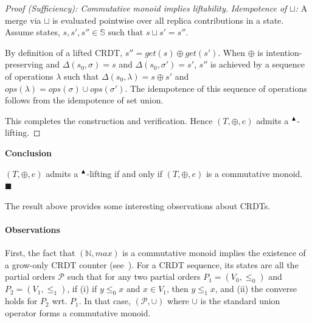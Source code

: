 \begin{proof}[Proof (Sufficiency): Commutative monoid implies liftability]


\noindent\textit{Idempotence of $\sqcup$:} A merge via $\sqcup$ is evaluated pointwise over all replica contributions in a state. Assume states, $s, s', s'' \in \mathbb{S}\text{ such that } s\sqcup s' = s''$. 

By definition of a lifted CRDT, $s'' = get(s) \oplus get (s')$. 
When $\oplus$ is intention-preserving and $\Delta(s_0,\sigma)=s$ and $\Delta(s_0,\sigma')=s'$, $s''$ is achieved by a sequence of operations $\lambda$ such that $\Delta(s_0,\lambda)=s \oplus s'$ and $ops(\lambda)=ops(\sigma) \cup ops(\sigma')$. 
The idempotence of this sequence of operations follows from the idempotence of set union. 

This completes the construction and verification. Hence $(T, \oplus, e)$ admits a ${}^{\blacktriangle}{}$-lifting.
\end{proof}

\noindent\textbf{Conclusion}

$(T, \oplus, e)$ admits a ${}^{\blacktriangle}{}$-lifting if and only if $(T, \oplus, e)$ is a commutative monoid.
\hfill$\blacksquare$



\medskip
The result above provides some interesting observations about CRDTs.

\paragraph{Observations}
First, the fact that $(\mathbb{N},\mathit{max})$ is a commutative monoid implies the existence of a grow-only CRDT counter (see~).
%
For a CRDT sequence, its states are all the partial orders $\mathcal{P}$ such that for any two partial orders $P_1=(V_0, \le_0)$ and $P_2=(V_1, \le_1)$, if (i) if $y \le_0 x$ and $x \in V_1$, then $y \le_1 x$, and (ii) the converse holds for $P_2$ wrt. $P_1$.
In that case, $(\mathcal{P}, \cup)$ where $\cup$ is the standard union operator forms a commutative monoid.

